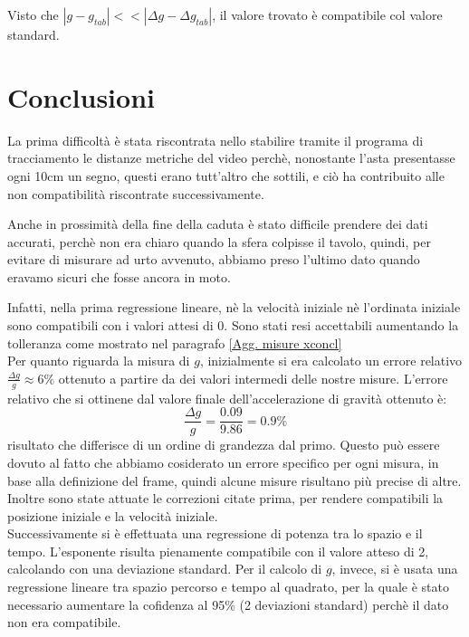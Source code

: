 \documentclass[12pt, a4paper]{article}
\begin{document}
Visto che $|g-g_{tab}|<< |\Delta g-\Delta g_{tab}|$, il valore trovato è compatibile col valore standard.



\section{Conclusioni}
La prima difficoltà è stata riscontrata nello stabilire tramite il programa di tracciamento le distanze metriche del video perchè, nonostante l'asta presentasse ogni 10cm un segno, questi erano tutt'altro che sottili, e ciò ha contribuito alle non compatibilità riscontrate successivamente. 

Anche in prossimità della fine della caduta è stato difficile prendere dei dati accurati, perchè non era chiaro quando la sfera colpisse il tavolo, quindi, per evitare di misurare ad urto avvenuto, abbiamo preso l'ultimo dato quando eravamo sicuri che fosse ancora in moto.

Infatti, nella prima regressione lineare, nè la velocità iniziale nè l'ordinata iniziale sono compatibili con i valori attesi di 0. Sono stati resi accettabili aumentando la tolleranza come mostrato nel paragrafo \ref{Agg. misure xconcl}\\

Per quanto riguarda la misura di $g$, inizialmente si era calcolato un errore relativo $\frac{\Delta g}{g}\approx 6\% $ ottenuto a partire da dei valori intermedi delle nostre misure. L'errore relativo che si ottinene dal valore finale dell'accelerazione di gravità ottenuto è:
\begin{equation*}
    \frac{\Delta g}{g}=\frac{0.09}{9.86}=0.9\%
\end{equation*}
risultato che differisce di un ordine di grandezza dal primo. Questo può essere dovuto al fatto che abbiamo cosiderato un errore specifico per ogni misura, in base alla definizione del frame, quindi alcune misure risultano più precise di altre. Inoltre sono state attuate le correzioni citate prima, per rendere compatibili  la posizione iniziale e la velocità iniziale. \\


Successivamente si è effettuata una regressione di potenza tra lo spazio e il tempo. L'esponente risulta pienamente compatibile con il valore atteso di 2, calcolando con una deviazione standard.
Per il calcolo di $g$, invece, si è usata una regressione lineare tra spazio percorso e tempo al quadrato, per la quale è stato necessario aumentare la cofidenza al 95\% (2 deviazioni standard) perchè il dato non era compatibile. \\
\end{document}
